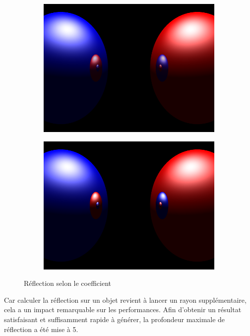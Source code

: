 \documentclass{article}
\begin{document}
\begin{figure}[hb]
  \begin{subfigure}{0.45\textwidth}
    \includegraphics[width=1\textwidth]{images/refl075.png}
  \end{subfigure}
  \begin{subfigure}{0.45\textwidth}
    \includegraphics[width=1\textwidth]{images/refl1.png}
  \end{subfigure}
  \caption{Réflection selon le coefficient\label{refl}}
\end{figure}

Car calculer la réflection sur un objet revient à lancer un rayon
supplémentaire, cela a un impact remarquable sur les performances. Afin
d'obtenir un résultat satisfaisant et suffisamment rapide à générer, la
profondeur maximale de réflection a été mise à 5.
\end{document}
